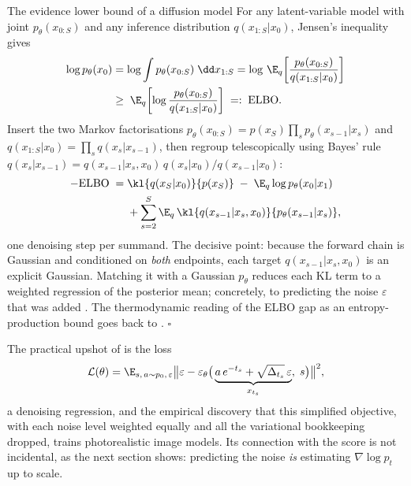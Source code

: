 \begin{toolbox}{The evidence lower bound of a diffusion model}
For any latent-variable model with joint $p_\theta(x_{0:S})$ and any
inference distribution $q(x_{1:S} | x_0)$, Jensen's inequality gives
\begin{align*}
  \log p_\theta(x_0)
  &= \log \int p_\theta(x_{0:S})\;\dd x_{1:S}
   = \log\, \E_{q}\!\left[
      \frac{p_\theta(x_{0:S})}{q(x_{1:S}|x_0)} \right] \\
  &\geq\; \E_{q}\!\left[
      \log \frac{p_\theta(x_{0:S})}{q(x_{1:S}|x_0)} \right]
  \;=:\; \mathrm{ELBO}.
\end{align*}
Insert the two Markov factorisations
$p_\theta(x_{0:S}) = p(x_S) \prod_s p_\theta(x_{s-1}|x_s)$ and
$q(x_{1:S}|x_0) = \prod_s q(x_s|x_{s-1})$, then regroup telescopically
using Bayes' rule
$q(x_s|x_{s-1}) = q(x_{s-1}|x_s, x_0)\, q(x_s|x_0) / q(x_{s-1}|x_0)$:
\begin{align*}
  -\mathrm{ELBO}
  \;=\;& \kl{q(x_S|x_0)}{p(x_S)}
  \;-\; \E_q \log p_\theta(x_0 | x_1) \\
  &+ \sum_{s=2}^{S}
    \E_q\, \kl{q(x_{s-1}|x_s, x_0)}{p_\theta(x_{s-1}|x_s)} ,
\end{align*}
one denoising step per summand. The decisive point: because the forward
chain is Gaussian and conditioned on \emph{both} endpoints, each target
$q(x_{s-1} | x_s, x_0)$ is an explicit Gaussian. Matching it with a
Gaussian $p_\theta$ reduces each KL term to a weighted regression of the
posterior mean; concretely, to predicting the noise $\varepsilon$ that
was added \citep{ho2020denoising}. The thermodynamic reading of the ELBO
gap as an entropy-production bound goes back to \citet{sohl2015deep}.
\hfill$\square$
\end{toolbox}

The practical upshot of \citet{ho2020denoising} is the loss
\begin{equation}
  \mathcal{L}(\theta)
  = \E_{s,\, a \sim p_0,\, \varepsilon}
    \big\| \varepsilon - \varepsilon_\theta\big(
      \underbrace{a\,e^{-t_s} + \sqrt{\Delta_{t_s}}\,\varepsilon}_{x_{t_s}},\; s
    \big) \big\|^2 ,
  \label{eq:ddpm-loss}
\end{equation}
a denoising regression, and the empirical discovery that this simplified
objective, with each noise level weighted equally and all the variational
bookkeeping dropped, trains photorealistic image models. Its connection
with the score is not incidental, as the next section shows: predicting
the noise \emph{is} estimating $\nabla \log p_t$ up to scale.

